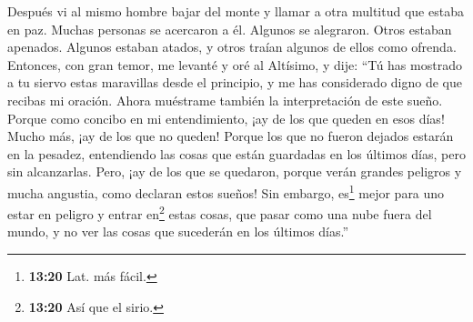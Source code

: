  Después vi al mismo hombre bajar del monte y llamar a
otra multitud que estaba en paz.  Muchas personas se
acercaron a él. Algunos se alegraron. Otros estaban apenados. Algunos
estaban atados, y otros traían algunos de ellos como ofrenda. Entonces,
con gran temor, me levanté y oré al Altísimo, y dije: 
``Tú has mostrado a tu siervo estas maravillas desde el principio, y me
has considerado digno de que recibas mi oración.  Ahora
muéstrame también la interpretación de este sueño. 
Porque como concibo en mi entendimiento, ¡ay de los que queden en esos
días! Mucho más, ¡ay de los que no queden!  Porque los
que no fueron dejados estarán en la pesadez,  entendiendo
las cosas que están guardadas en los últimos días, pero sin alcanzarlas.
 Pero, ¡ay de los que se quedaron, porque verán grandes
peligros y mucha angustia, como declaran estos sueños! 
Sin embargo, es\footnote{\textbf{13:20} Lat. más fácil.} mejor para uno
estar en peligro y entrar en\footnote{\textbf{13:20} Así que el sirio.}
estas cosas, que pasar como una nube fuera del mundo, y no ver las cosas
que sucederán en los últimos días.''

